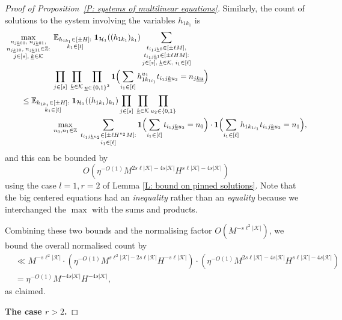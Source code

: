 \documentclass[10pt,a4paper]{amsart}
\newcommand{\Bigbrac}[1]{\Bigl( #1 \Bigr)}
\newcommand{\CH}{{\mathcal H}}
\newcommand{\CK}{{\mathcal K}}
\newcommand{\E}{{\mathbb E}}
\newcommand{\Z}{{\mathbb Z}}
\newcommand{\brac}[1]{\mathopen{}\left( #1 \mathclose{}\right)}
\newcommand{\uk}{{\underline{k}}}
\newcommand{\uu}{{\underline{u}}}
\begin{document}
\begin{proof}[Proof of Proposition~\ref{P: systems of multilinear equations}]
    Similarly, the count of solutions to the system involving the variables $h_{1k_1}$ is
\begin{align*}
        &\max_{\substack{n_{j\uk00},\; n_{j\uk01},\\ n_{j\uk10},\; n_{j\uk11}\in\Z:\\ j\in[s],\; \uk\in\CK}}\;
        \E_{\substack{h_{1k_1}\in[\pm H]:\\  k_1\in[t]}}\; \mathbf{1}_{\CH_1}((h_{1k_1})_{k_1}) \sum_{\substack{t_{i_1 j\uk 0}\in[\pm\ell M],\\ t_{i_1 j\uk 1}\in[\pm\ell H M]:\\ j\in[s],\; \uk\in\CK,\; i_1\in[\ell]}}\\
        &\qquad\qquad\qquad\prod_{j\in[s]}\; \prod_{\substack{\uk\in\CK}}\prod_{\substack{\uu\in\{0,1\}^2}} \mathbf{1}\Bigbrac{\sum\limits_{i_1\in[\ell]} h_{1k_{1i_1}}^{u_1} t_{i_1 j\uk u_2} = n_{j\uk\uu}}\\
        &\qquad\leq  \E_{\substack{h_{1k_1}\in[\pm H]:\\  k_1\in[t]}}\; \mathbf{1}_{\CH_1}((h_{1k_1})_{k_1}) \prod_{j\in[s]}\; \prod_{\substack{\uk\in\CK}}\prod_{\substack{u_2\in\{0,1\}}}\\
        &\qquad\qquad\qquad\max_{n_0, n_1\in\Z}\; \sum_{\substack{t_{i_1 j\uk u_2}\in[\pm\ell H^{u_2} M]:\\  i_1\in[\ell]}}\mathbf{1}\Bigbrac{\sum\limits_{i_1\in[\ell]} t_{i_1 j\uk u_2} = n_0}\cdot \mathbf{1}\Bigbrac{\sum\limits_{i_1\in[\ell]} h_{1k_{1i_1}} t_{i_1 j\uk u_2} = n_1},
\end{align*}
and this can be bounded by
$$O(\eta^{-O(1)} M^{2 s\ell |\CK|-4s|\CK|} H^{s\ell|\CK|-4s|\CK|})$$
using the case $l=1, r=2$ of Lemma \ref{L: bound on pinned solutions}. Note that the big centered equations had an  \emph{inequality} rather than an \emph{equality} because we interchanged the $\max$ with the sums and products.

    Combining these two bounds and the normalising factor $O(M^{-s \ell^2|\CK|})$, we bound the overall normalised count by
    \begin{align*}
        &\ll M^{-s \ell^2|\CK|}\cdot \brac{\eta^{-O(1)} M^{s\ell^2|\CK|-2s\ell|\CK|} H^{-s\ell|\CK|}}\cdot \brac{\eta^{-O(1)} M^{2 s\ell|\CK|-4s|\CK|} H^{s\ell|\CK|-4s|\CK|}}\\
        &= \eta^{-O(1)} M^{-4s|\CK|}H^{-4s|\CK|},
    \end{align*}
    as claimed.

\smallskip
\textbf{The case $r>2$.}
\smallskip


\end{proof}
\end{document}
